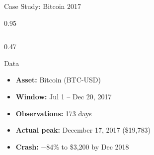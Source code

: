\documentclass[9pt, aspectratio=169, t]{beamer}
\begin{document}
\begin{frame}{Case Study: Bitcoin 2017}
    \begin{cminipage}{0.95\textwidth}
    {\footnotesize
    \begin{columns}[T]
        \begin{column}{0.47\textwidth}
            \begin{block}{Data}
                \begin{itemize}\setlength{\itemsep}{0pt}
                    \item \textbf{Asset:} Bitcoin (BTC-USD)
                    \item \textbf{Window:} Jul 1 -- Dec 20, 2017
                    \item \textbf{Observations:} 173 days
                    \item \textbf{Actual peak:} December 17, 2017 (\$19{,}783)
                    \item \textbf{Crash:} $-84\%$ to \$3{,}200 by Dec 2018
                \end{itemize}
            \end{block}


\end{column}
\end{columns}}
\end{cminipage}
\end{frame}
\end{document}
